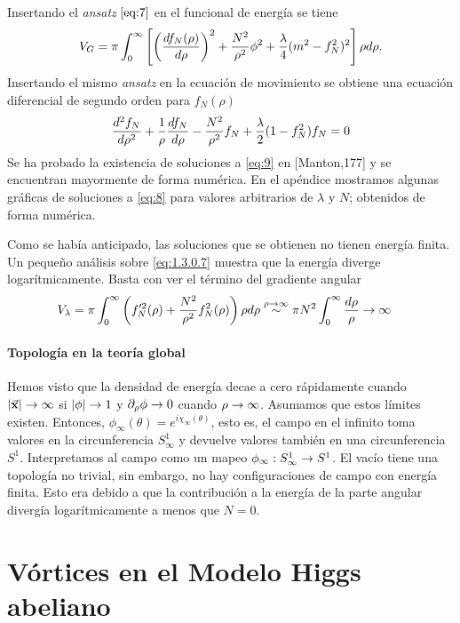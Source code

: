 Insertando el \emph{ansatz} $\eqref{eq:7}$ en el funcional de energía se tiene 
\begin{align}
	V_G = \pi\int_0^\infty \left[\left(\frac{df_N(\rho)}{d\rho}\right)^2+\frac{N^2}{\rho^2}\phi^2+\frac{\lambda}{4}(m^2-f_N^2)^2\right]\rho d\rho. \label{eq:1.3.0.7}
\end{align}
Insertando el mismo \emph{ansatz} en la ecuación de movimiento se obtiene una ecuación diferencial de segundo orden para $f_N(\rho)$
\begin{align}
    \frac{d^2f_N}{d\rho^2}+\frac{1}{\rho}\frac{d f_N}{d\rho}-\frac{N^2}{\rho^2}f_N+\frac{\lambda}{2}(1-f_N^2)f_N=0 \label{eq:8}
\end{align}
Se ha probado la existencia de soluciones a \eqref{eq:9} en [Manton,177] y se encuentran mayormente de forma numérica. En el apéndice  mostramos algunas gráficas de soluciones a \eqref{eq:8} para valores arbitrarios de $\lambda$ y $N$; obtenidos de forma numérica.

Como se había anticipado, las soluciones que se obtienen no tienen energía finita. Un pequeño análisis sobre \eqref{eq:1.3.0.7} muestra que la energía  diverge logarítmicamente. Basta con ver el término del gradiente angular
\begin{align}
    V_\lambda &= \pi\int_0^\infty\left(f'^2_N(\rho)+\frac{N^2}{\rho^2}f_N^2(\rho)\right)\rho d\rho \overset{\rho\rightarrow\infty}{\sim} \pi N^2\int_0^\infty \frac{d\rho}{\rho}\rightarrow\infty \label{eq:9} 
\end{align}

\paragraph{Topología en la teoría global} Hemos visto que la densidad de energía decae a cero rápidamente cuando $|\vec{\mathbf{x}}|\rightarrow\infty$ si $|\phi|\rightarrow 1$ y $\partial_\rho\phi\rightarrow 0$ cuando $\rho\rightarrow\infty$. Asumamos que estos límites existen. Entonces, $\phi_\infty(\theta)=e^{i\chi_\infty(\theta)}$, esto es, el campo en el infinito toma valores en la circunferencia $S^1_\infty$ y devuelve valores también en una circunferencia $S^1$. Interpretamos al campo como un mapeo $\phi_\infty:S^1_\infty\rightarrow S^1$. El vacío tiene una topología no trivial, sin embargo, no hay configuraciones de campo con energía finita. Esto era debido a que la contribución a  la energía de la parte angular divergía logarítmicamente a menos que $N=0$.

\section{Vórtices en el Modelo Higgs abeliano}

